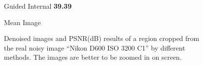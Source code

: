 \begin{figure}
{\begin{minipage}[t]{0.19\textwidth}
{\footnotesize Guided Internal \textbf{39.39}}
\end{minipage}
\begin{minipage}[t]{0.19\textwidth}
\centering
{}
{\footnotesize Mean Image}
\end{minipage}
}
    \caption{Denoised images and PSNR(dB) results of a region cropped from the real noisy image ``Nikon D600 ISO 3200 C1'' \cite{crosschannel2016} by different methods. The images are better to be zoomed in on screen.}
    \label{fig3-7}
\end{figure}


